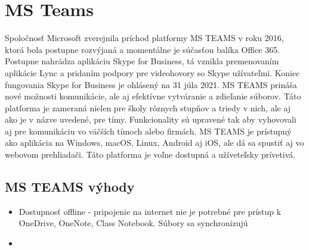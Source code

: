 \documentclass[10pt,twoside,slovak,a4paper]{article}
\begin{document}
\section{MS Teams} \label{MS Teams}
Spoločnosť Microsoft zverejnila príchod platformy MS TEAMS v roku 2016, ktorá bola postupne rozvýjaná a momentálne je súčasťou balíka Office 365. Postupne nahrádza aplikáciu Skype for Business, tá vznikla premenovaním aplikácie Lync a pridaním podpory pre videohovory so Skype užívateľmi. Koniec fungovania Skype for Business je ohlásený na 31 júla 2021. MS TEAMS prináša nové možnosti komunikácie, ale aj efektívne vytváranie a zdieľanie súborov. Táto platforma je zameraná nielen pre školy rôznych stupňov a triedy v nich, ale aj ako je v názve uvedené, pre tímy. Funkcionality sú upravené tak aby vyhovovali aj pre komunikáciu vo väčších tímoch alebo firmách. MS TEAMS je prístupný ako aplikácia na Windows, macOS, Linux, Android aj iOS, ale dá sa spustiť aj vo webovom prehliadači. Táto platforma je voľne dostupná a užíveteľsky prívetivá. \cite {MS-TEAMS}

\subsection{MS TEAMS výhody} \label{MS TEAMS: MS TEAMS výhody}

\begin{itemize}
	\item Dostupnosť offline - pripojenie na internet nie je potrebné pre prístup k OneDrive, OneNote, Class Notebook. Súbory sa synchronizujú
 	\item 
	\end{itemize}







\end{document}
